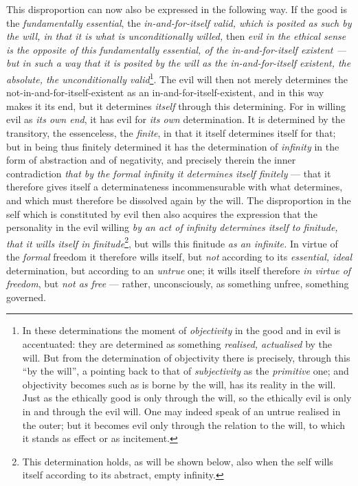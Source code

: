 \documentclass[12pt,a4paper]{book}
\begin{document}
This disproportion can now also be expressed in the following way. If the good
is the \emph{fundamentally essential}, the \emph{in-and-for-itself valid, which
is posited as such by the will, in that it is what is unconditionally willed,}
then \emph{evil in the ethical sense is the opposite of this fundamentally
essential, of the in-and-for-itself existent --- but in such a way that it is
posited by the will as the in-and-for-itself existent, the absolute, the
unconditionally valid}\footnote{In these determinations the moment of
\emph{objectivity} in the good and in evil is accentuated: they are determined
as something \emph{realised, actualised} by the will. But from the determination
of objectivity there is precisely, through this ``by the will'', a pointing back
to that of \emph{subjectivity} as the \emph{primitive} one; and objectivity
becomes such as is borne by the will, has its reality in the will. Just as the
ethically good is only through the will, so the ethically evil is only in and
through the evil will. One may indeed speak of an untrue realised in the outer;
but it becomes evil only through the relation to the will, to which it stands as
effect or as incitement.}. The evil will then not merely determines the
not-in-and-for-itself-existent as an in-and-for-itself-existent, and in this way
makes it its end, but it determines \emph{itself} through this determining. For
in willing evil as \emph{its own end}, it has evil for \emph{its own}
determination. It is determined by the transitory, the essenceless, the
\emph{finite}, in that it itself determines itself for that; but in being thus
finitely determined it has the determination of \emph{infinity} in the form of
abstraction and of negativity, and precisely therein the inner contradiction
\emph{that by the formal infinity it determines itself finitely} --- that it
therefore gives itself a determinateness incommensurable with what determines,
and which must therefore be dissolved again by the will.
\setcounter{footnote}{0}%
The disproportion in the self which is constituted by evil then also acquires
the expression that the personality in the evil willing \emph{by an act of
infinity determines itself to finitude, that it wills itself in
finitude}\footnote{This determination holds, as will be shown below, also when
the self wills itself according to its abstract, empty infinity.}, but wills
this finitude \emph{as an infinite.} In virtue of the \emph{formal} freedom it
therefore wills itself, but \emph{not} according to its \emph{essential, ideal}
determination, but according to an \emph{untrue} one; it wills itself therefore
\emph{in virtue of freedom}, but \emph{not as free} --- rather, unconsciously,
as something unfree, something governed.
\end{document}
